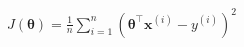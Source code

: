 \documentclass[preview]{standalone}
\begin{document}
\begin{align*}
J(\mathbf{\theta}) = \frac{1}{n} \sum_{i=1}^n \left(\mathbf{\theta}^{\top}\mathbf{x}^{(i)} - y^{(i)}\right)^2
\end{align*}
\end{document}
